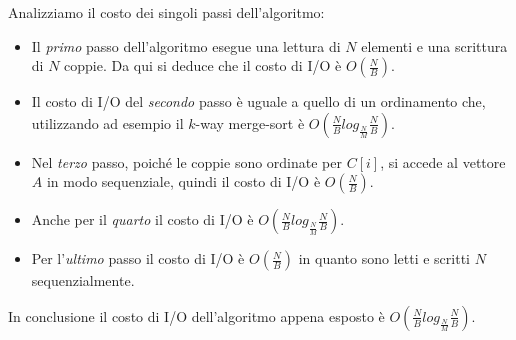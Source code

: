 Analizziamo il costo dei singoli passi dell'algoritmo:
\begin{itemize}
    \item Il \emph{primo} passo dell'algoritmo esegue una lettura di \(N\) elementi
    e una scrittura di \(N\) coppie. Da qui si deduce che il costo di I/O è
    \(O\left(\frac{N}{B}\right)\).
    \item Il costo di I/O del \emph{secondo} passo è uguale a quello di un
    ordinamento che, utilizzando ad esempio il \(k\)-way merge-sort è
    \(O\left(\frac{N}{B}log_\frac{N}{M} \frac{N}{B}\right)\).
    \item Nel \emph{terzo} passo, poiché le coppie sono ordinate per \(C[i]\), si accede
    al vettore \(A\) in modo sequenziale, quindi il costo di I/O è \(O\left(\frac{N}{B}\right)\).
    \item Anche per il \emph{quarto} il costo di I/O è
    \(O\left(\frac{N}{B}log_\frac{N}{M} \frac{N}{B}\right)\).
    \item Per l'\emph{ultimo} passo il costo di I/O è \(O\left(\frac{N}{B}\right)\) in quanto
    sono letti e scritti \(N\) sequenzialmente.
\end{itemize}

In conclusione il costo di I/O dell'algoritmo appena esposto è
\(O\left(\frac{N}{B}log_\frac{N}{M} \frac{N}{B}\right)\).
